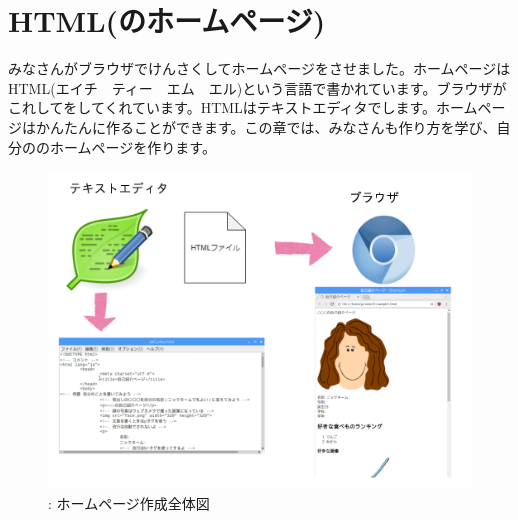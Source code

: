 \documentclass[a4paper,12pt]{jarticle}
\begin{document}
\section{HTML(のホームページ)}
みなさんがブラウザでけんさくしてホームページをさせました。ホームページはHTML(エイチ　ティー　エム　エル)という言語で書かれています。ブラウザがこれしてをしてくれています。HTMLはテキストエディタでします。ホームページはかんたんに作ることができます。この章では、みなさんも作り方を学び、自分ののホームページを作ります。


\bigskip


\bigskip


\bigskip


\bigskip



\begin{figure}[hb]
  \centering
  \begin{minipage}{15.801cm}
    {\upshape
      \includegraphics[width=15.801cm]{textbook-img140.png}
      \newline
      : ホームページ作成全体図}
  \end{minipage}
\end{figure}
\clearpage
\end{document}
